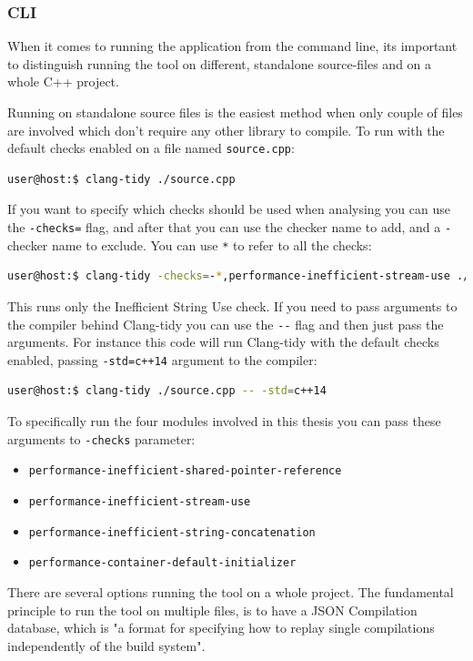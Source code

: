\subsubsection{CLI}
\par When it comes to running the application from the command line, its important to distinguish running the tool on different, standalone source-files and on a whole C++ project. \medskip
\par Running on standalone source files is the easiest method when only couple of files are involved which don't require any other library to compile. To run with the default checks enabled on a file named \verb|source.cpp|:
\begin{lstlisting}[language=bash, frame=single]
user@host:$ clang-tidy ./source.cpp
\end{lstlisting}
\par If you want to specify which checks should be used when analysing you can use the \verb|-checks=| flag, and after that you can use the checker name to add, and a \verb|-| checker name to exclude. You can use \verb|*| to refer to all the checks:
 \begin{lstlisting}[language=bash, frame=single]
 user@host:$ clang-tidy -checks=-*,performance-inefficient-stream-use ./source.cpp
 \end{lstlisting}
 \par This runs only the Inefficient String Use check. If you need to pass arguments to the compiler behind Clang-tidy you can use the \verb|--| flag and then just pass the arguments. For instance this code will run Clang-tidy with the default checks enabled, passing \verb|-std=c++14| argument to the compiler:
 \begin{lstlisting}[language=bash, frame=single]
 user@host:$ clang-tidy ./source.cpp -- -std=c++14
 \end{lstlisting}
 \par To specifically run the four modules involved in this thesis you can pass these arguments to \verb|-checks| parameter:
 \begin{itemize}
 	\item \verb|performance-inefficient-shared-pointer-reference|
 	\item \verb|performance-inefficient-stream-use|
 	\item \verb|performance-inefficient-string-concatenation|
 	\item \verb|performance-container-default-initializer|
 \end{itemize}
\par There are several options running the tool on a whole project. The fundamental principle to run the tool on multiple files, is to have a JSON Compilation database, which is "a format for specifying how to replay single compilations independently of the build system"\cite{compilation_db}. 
